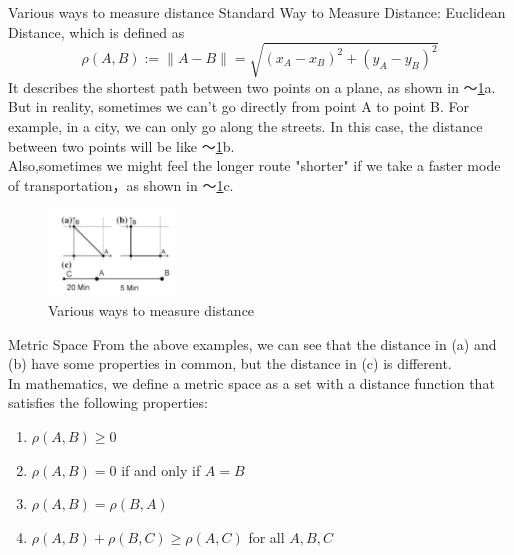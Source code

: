 \documentclass[xcolor=dvipsnames]{beamer}
\theoremstyle{remark}
\begin{document}
\begin{frame}{Various ways to measure distance}
  \hspace*{1em}Standard Way to Measure Distance: Euclidean Distance, which is defined as
$$
\rho(A, B) := \|A - B\| = \sqrt{(x_A - x_B)^2 + (y_A - y_B)^2}
$$
\hspace*{1em}It describes the shortest path between two points on a plane, as shown in \figurename～\ref{Fig1}a.\\
\hspace*{1em}But in reality, sometimes we can't go directly from point A to point B. For example, in a city, we can only go along the streets. In this case, the distance between two points will be like \figurename～\ref{Fig1}b.\\
\hspace*{1em}Also,sometimes we might feel the longer route "shorter" if we take a faster mode of transportation，as shown in \figurename～\ref{Fig1}c.


  \begin{figure}[H] %
      \centering       %
      \includegraphics[width=0.3\textwidth]{fig1.png} %
      \caption{Various ways to measure distance} %
      \label{Fig1}   %
  \end{figure}

\end{frame}
\begin{frame}{Metric Space}
  \hspace*{1em}From the above examples, we can see that the distance in (a) and (b) have some properties in common, but the distance in (c) is different.\\
  \hspace*{1em}In mathematics, we define a metric space as a set with a distance function that satisfies the following properties:
  \begin{enumerate}[label=\roman*.]
    \item $\rho(A, B) \geq 0$
    \item $\rho(A, B) = 0$ if and only if $A = B$
    \item $\rho(A, B) = \rho(B, A)$
    \item $\rho(A, B) + \rho(B, C) \geq \rho(A, C)$ for all $A, B, C$
  \end{enumerate}
\end{frame}
\end{document}

